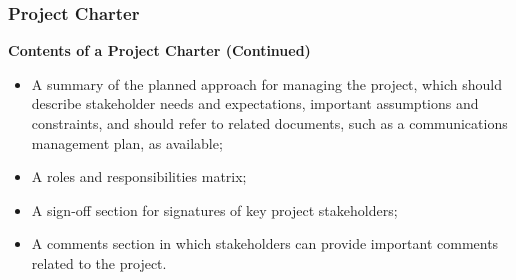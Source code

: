 \documentclass{beamer}
\begin{document}
\begin{frame}
\frametitle{Project Charter}
\textbf{Contents of a Project Charter (Continued)}
\vspace{0.5cm}
\begin{itemize}
\item A summary of the planned approach for managing the project, which should describe stakeholder needs and expectations, important assumptions and constraints, and should refer to related documents, such as a communications management plan, as available;
\item A roles and responsibilities matrix;
\item A sign-off section for signatures of key project stakeholders;
\item A comments section in which stakeholders can provide important comments related to the project.
\end{itemize}
\end{frame}
\end{document}
